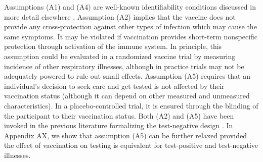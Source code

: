 \documentclass[11pt]{article}
\begin{document}
Assumptions (A1) and (A4) are well-known identifiability conditions discussed in more detail elsewhere \cite{hernan_causal_2020}. Assumption (A2) implies that the vaccine does not provide any cross-protection against other types of infection which may cause the same symptoms. It may be violated if vaccination provides short-term nonspecific protection through activation of the immune system. In principle, this assumption could be evaluated in a randomized vaccine trial by measuring incidence of other respiratory illnesses, although in practice trials may not be adequately powered to rule out small effects. Assumption (A5) requires that an individual's decision to seek care and get tested is not affected by their vaccination status (although it can depend on other measured and unmeasured characteristics). In a placebo-controlled trial, it is ensured through the blinding of the participant to their vaccination status. Both (A2) and (A5) have been invoked in the previous literature formalizing the test-negative design \cite{jackson_test-negative_2013,schnitzer_estimands_2022}. In Appendix AX, we show that assumption (A5) can be further relaxed provided the effect of vaccination on testing is equivalent for test-positive and test-negative illnesses.
\end{document}
